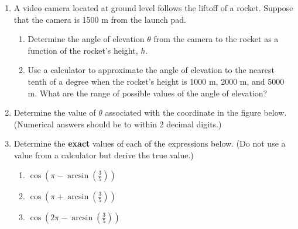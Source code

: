 \begin{enumerate}
  \vfill

\item A video camera located at ground level follows the liftoff of a
  rocket.  Suppose that the camera is 1500 m from the launch pad.
\begin{enumerate}
\item Determine the angle of elevation $\theta$ from the camera to the
  rocket as a function of the rocket's height, $h$.
  
  \vfill
  
\item Use a calculator to approximate the angle of elevation to the
  nearest tenth of a degree when the rocket's height is 1000 m, 2000
  m, and 5000 m. What are the range of possible values of the angle of
  elevation?
  
  \vfill
\end{enumerate}

\clearpage
\item Determine the value of $\theta$ associated with the coordinate
      in the figure below. (Numerical answers should be to within 2
      decimal digits.)


\item Determine the \textbf{exact} values of each of the
  expressions below. (Do not use a value from a calculator but derive the true value.)
  \begin{enumerate}


  \item
    ${\displaystyle \cos\left(\pi -  \arcsin\left(\frac{3}{5}\right) \right) }$ 
    \vfill
    
   \item
    ${\displaystyle \cos\left(\pi + \arcsin\left(\frac{3}{5}\right) \right) }$ 
    \vfill
    
      \item
    ${\displaystyle \cos\left(2\pi - \arcsin\left(\frac{3}{5}\right) \right) }$ 
    \vfill   
    


  \end{enumerate}

\end{enumerate}

